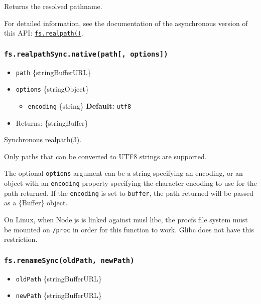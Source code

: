 Returns the resolved pathname.

For detailed information, see the documentation of the asynchronous
version of this API:
\hyperref[fsrealpathpath-options-callback]{\texttt{fs.realpath()}}.

\subsubsection{\texorpdfstring{\texttt{fs.realpathSync.native(path{[},\ options{]})}}{fs.realpathSync.native(path{[}, options{]})}}\label{fs.realpathsync.nativepath-options}

\begin{itemize}
\tightlist
\item
  \texttt{path} \{string\textbar Buffer\textbar URL\}
\item
  \texttt{options} \{string\textbar Object\}

  \begin{itemize}
  \tightlist
  \item
    \texttt{encoding} \{string\} \textbf{Default:}
    \texttt{\textquotesingle{}utf8\textquotesingle{}}
  \end{itemize}
\item
  Returns: \{string\textbar Buffer\}
\end{itemize}

Synchronous realpath(3).

Only paths that can be converted to UTF8 strings are supported.

The optional \texttt{options} argument can be a string specifying an
encoding, or an object with an \texttt{encoding} property specifying the
character encoding to use for the path returned. If the
\texttt{encoding} is set to
\texttt{\textquotesingle{}buffer\textquotesingle{}}, the path returned
will be passed as a \{Buffer\} object.

On Linux, when Node.js is linked against musl libc, the procfs file
system must be mounted on \texttt{/proc} in order for this function to
work. Glibc does not have this restriction.

\subsubsection{\texorpdfstring{\texttt{fs.renameSync(oldPath,\ newPath)}}{fs.renameSync(oldPath, newPath)}}\label{fs.renamesyncoldpath-newpath}

\begin{itemize}
\tightlist
\item
  \texttt{oldPath} \{string\textbar Buffer\textbar URL\}
\item
  \texttt{newPath} \{string\textbar Buffer\textbar URL\}
\end{itemize}


